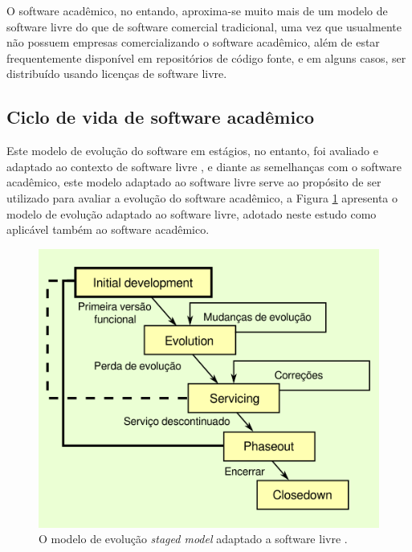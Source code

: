 

O software acadêmico, no entando, aproxima-se muito mais de um modelo de
software livre do que de software comercial tradicional, uma vez que usualmente
não possuem empresas comercializando o software acadêmico, além de estar
frequentemente disponível em repositórios de código fonte, e em
alguns casos, ser distribuído usando licenças de software livre.

\subsection{Ciclo de vida de software acadêmico}

Este modelo de evolução do software em estágios, no entanto, foi avaliado e adaptado
ao contexto de software livre \cite{capiluppi2007adapting}, e diante as
semelhanças com o software acadêmico, este modelo adaptado ao software livre serve ao propósito de ser
utilizado para
avaliar a evolução do software acadêmico, a Figura \ref{staged-model-foss-cycle}
apresenta o modelo de evolução adaptado ao software livre, adotado
neste estudo como aplicável também ao software acadêmico.

\begin{figure}[h]
  \center
  \includegraphics[scale=0.6]{imagens/staged-model-foss-cycle.png}
  \caption{O modelo de evolução {\it staged model} adaptado a software livre \cite{capiluppi2007adapting}.}
  \label{staged-model-foss-cycle}
\end{figure}

